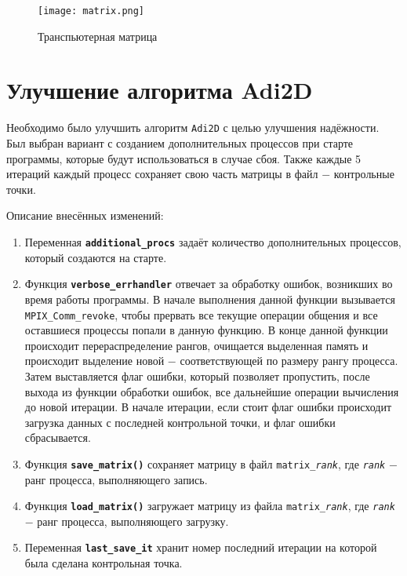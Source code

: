 \documentclass[a4peper, 12pt, titlepage, finall]{extreport}
\begin{document}
        \begin{figure}[htbp]
            \centering
            \texttt{[image: matrix.png]}
            \caption{Транспьютерная матрица}\label{fig:dep}
        \end{figure}
    \section{Улучшение алгоритма \textbf{Adi2D}}
        Необходимо было улучшить алгоритм {\tt Adi2D} с целью улучшения надёжности.
        Был выбран вариант с созданием дополнительных процессов при старте программы, которые будут использоваться в случае сбоя.
        Также каждые 5 итераций каждый процесс сохраняет свою часть матрицы в файл $-$ контрольные точки.

        Описание внесённых изменений:
        \begin{enumerate}
            \item Переменная {\tt \bf additional\_procs} задаёт количество дополнительных процессов, который создаются на старте.
            \item Функция {\tt \bf verbose\_errhandler} отвечает за обработку ошибок, возникших во время работы программы.
                В начале выполнения данной функции вызывается {\tt MPIX\_Comm\_revoke}, чтобы прервать все текущие операции
                общения и все оставшиеся процессы попали в данную функцию. В конце данной функции происходит перераспределение рангов, очищается
                выделенная память и происходит выделение новой $-$ соответствующей по размеру рангу процесса. Затем выставляется флаг ошибки, который позволяет
                пропустить, после выхода из функции обработки ошибок, все дальнейшие операции вычисления до новой итерации. В начале итерации, если стоит флаг
                ошибки происходит загрузка данных с последней контрольной точки, и флаг ошибки сбрасывается.
            \item Функция {\tt \bf save\_matrix()} сохраняет матрицу в файл {\tt matrix\_{\it rank}}, где {\tt \it rank} $-$ ранг процесса, выполняющего запись.
            \item Функция {\tt \bf load\_matrix()} загружает матрицу из файла {\tt matrix\_{\it rank}}, где {\tt \it rank} $-$ ранг процесса, выполняющего загрузку.
            \item Переменная {\tt \bf last\_save\_it} хранит номер последний итерации на которой была сделана контрольная точка.
        \end{enumerate}
\end{document}
